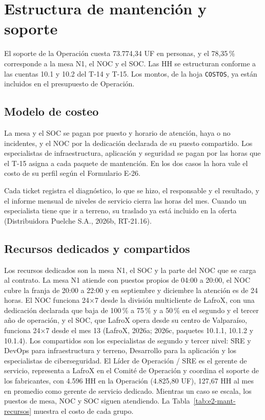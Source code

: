 \section{Estructura de mantención y soporte}
\label{sec:e2-mantencion}

El soporte de la Operación cuesta 73.774,34 UF en personas, y el 78,35\,\% corresponde a la mesa N1, el NOC y el SOC. Las HH se estructuran conforme a las cuentas 10.1 y 10.2 del T-14 y T-15. Los montos, de la hoja \texttt{COSTOS}, ya están incluidos en el presupuesto de Operación.

\subsection{Modelo de costeo}
\label{sec:e2-mant-modelo}

La mesa y el SOC se pagan por puesto y horario de atención, haya o no incidentes, y el NOC por la dedicación declarada de su puesto compartido. Los especialistas de infraestructura, aplicación y seguridad se pagan por las horas que el T-15 asigna a cada paquete de mantención. En los dos casos la hora vale el costo de su perfil según el Formulario E-26.

Cada ticket registra el diagnóstico, lo que se hizo, el responsable y el resultado, y el informe mensual de niveles de servicio cierra las horas del mes. Cuando un especialista tiene que ir a terreno, su traslado ya está incluido en la oferta (Distribuidora Puelche S.A., 2026b, RT-21.16).

\subsection{Recursos dedicados y compartidos}
\label{sec:e2-mant-recursos}

Los recursos dedicados son la mesa N1, el SOC y la parte del NOC que se carga al contrato. La mesa N1 atiende con puestos propios de 04:00 a 20:00, el NOC cubre la franja de 20:00 a 22:00 y en septiembre y diciembre la atención es de 24 horas. El NOC funciona 24×7 desde la división multicliente de LafroX, con una dedicación declarada que baja de 100\,\% a 75\,\% y a 50\,\% en el segundo y el tercer año de operación, y el SOC, que LafroX opera desde su centro de Valparaíso, funciona 24×7 desde el mes 13 (LafroX, 2026a; 2026c, paquetes 10.1.1, 10.1.2 y 10.1.4). Los compartidos son los especialistas de segundo y tercer nivel: SRE y DevOps para infraestructura y terreno, Desarrollo para la aplicación y los especialistas de ciberseguridad. El Líder de Operación / SRE es el gerente de servicio, representa a LafroX en el Comité de Operación y coordina el soporte de los fabricantes, con 4.596 HH en la Operación (4.825,80 UF), 127,67 HH al mes en promedio como gerente de servicio dedicado. Mientras un caso se escala, los puestos de mesa, NOC y SOC siguen atendiendo. La Tabla~\ref{tab:e2-mant-recursos} muestra el costo de cada grupo.

